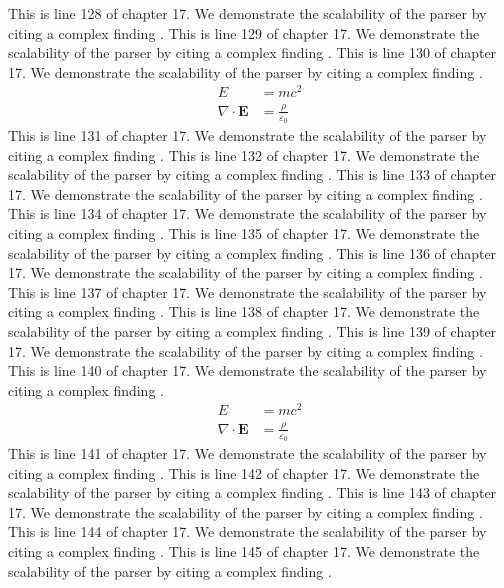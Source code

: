 This is line 128 of chapter 17. We demonstrate the scalability of the parser by citing a complex finding \cite{ref17_128}.
This is line 129 of chapter 17. We demonstrate the scalability of the parser by citing a complex finding \cite{ref17_129}.
This is line 130 of chapter 17. We demonstrate the scalability of the parser by citing a complex finding \cite{ref17_130}.
\begin{align*}
  E &= mc^2 \\
  \nabla \cdot \mathbf{E} &= \frac{\rho}{\varepsilon_0}
\end{align*}
This is line 131 of chapter 17. We demonstrate the scalability of the parser by citing a complex finding \cite{ref17_131}.
This is line 132 of chapter 17. We demonstrate the scalability of the parser by citing a complex finding \cite{ref17_132}.
This is line 133 of chapter 17. We demonstrate the scalability of the parser by citing a complex finding \cite{ref17_133}.
This is line 134 of chapter 17. We demonstrate the scalability of the parser by citing a complex finding \cite{ref17_134}.
This is line 135 of chapter 17. We demonstrate the scalability of the parser by citing a complex finding \cite{ref17_135}.
This is line 136 of chapter 17. We demonstrate the scalability of the parser by citing a complex finding \cite{ref17_136}.
This is line 137 of chapter 17. We demonstrate the scalability of the parser by citing a complex finding \cite{ref17_137}.
This is line 138 of chapter 17. We demonstrate the scalability of the parser by citing a complex finding \cite{ref17_138}.
This is line 139 of chapter 17. We demonstrate the scalability of the parser by citing a complex finding \cite{ref17_139}.
This is line 140 of chapter 17. We demonstrate the scalability of the parser by citing a complex finding \cite{ref17_140}.
\begin{align*}
  E &= mc^2 \\
  \nabla \cdot \mathbf{E} &= \frac{\rho}{\varepsilon_0}
\end{align*}
This is line 141 of chapter 17. We demonstrate the scalability of the parser by citing a complex finding \cite{ref17_141}.
This is line 142 of chapter 17. We demonstrate the scalability of the parser by citing a complex finding \cite{ref17_142}.
This is line 143 of chapter 17. We demonstrate the scalability of the parser by citing a complex finding \cite{ref17_143}.
This is line 144 of chapter 17. We demonstrate the scalability of the parser by citing a complex finding \cite{ref17_144}.
This is line 145 of chapter 17. We demonstrate the scalability of the parser by citing a complex finding \cite{ref17_145}.

